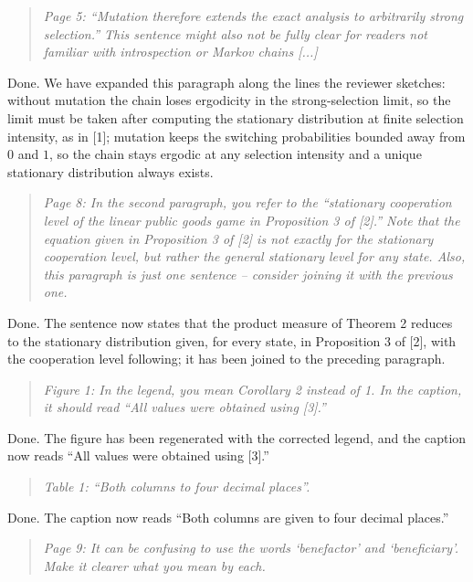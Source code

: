 \documentclass[11pt]{article}
\newenvironment{reviewerquote}
  {\begin{quote}\itshape}
  {\end{quote}}
\begin{document}
\begin{reviewerquote}
Page 5: ``Mutation therefore extends the exact analysis to arbitrarily strong
selection.'' This sentence might also not be fully clear for readers not
familiar with introspection or Markov chains [...]
\end{reviewerquote}

Done. We have expanded this paragraph along the lines the reviewer sketches:
without mutation the chain loses ergodicity in the strong-selection limit, so
the limit must be taken after computing the stationary distribution at finite
selection intensity, as in [1]; mutation keeps the switching probabilities
bounded away from \(0\) and \(1\), so the chain stays ergodic at any
selection intensity and a unique stationary distribution always exists.

\begin{reviewerquote}
Page 8: In the second paragraph, you refer to the ``stationary cooperation
level of the linear public goods game in Proposition 3 of [2].'' Note that
the equation given in Proposition 3 of [2] is not exactly for the stationary
cooperation level, but rather the general stationary level for any state.
Also, this paragraph is just one sentence -- consider joining it with the
previous one.
\end{reviewerquote}

Done. The sentence now states that the product measure of Theorem 2 reduces
to the stationary distribution given, for every state, in Proposition 3 of
[2], with the cooperation level following; it has been joined to the
preceding paragraph.

\begin{reviewerquote}
Figure 1: In the legend, you mean Corollary 2 instead of 1. In the caption,
it should read ``All values were obtained using [3].''
\end{reviewerquote}

Done. The figure has been regenerated with the corrected legend, and the
caption now reads ``All values were obtained using [3].''

\begin{reviewerquote}
Table 1: ``Both columns to four decimal places''.
\end{reviewerquote}

Done. The caption now reads ``Both columns are given to four decimal
places.''

\begin{reviewerquote}
Page 9: It can be confusing to use the words `benefactor' and `beneficiary'.
Make it clearer what you mean by each.
\end{reviewerquote}
\end{document}
